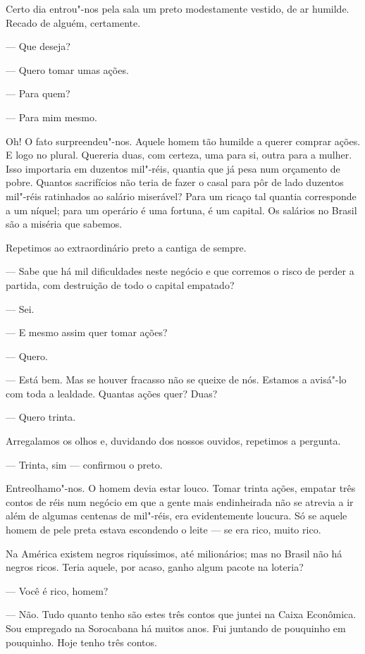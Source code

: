 Certo dia entrou"-nos pela sala um preto modestamente vestido, de ar
humilde. Recado de alguém, certamente.

--- Que deseja?

--- Quero tomar umas ações.

--- Para quem?

--- Para mim mesmo.

Oh! O fato surpreendeu"-nos. Aquele homem tão humilde a querer comprar
ações. E logo no plural. Quereria duas, com certeza, uma para si, outra
para a mulher. Isso importaria em duzentos mil"-réis, quantia que já pesa
num orçamento de pobre. Quantos sacrifícios não teria de fazer o casal
para pôr de lado duzentos mil"-réis ratinhados ao salário miserável? Para
um ricaço tal quantia corresponde a um níquel; para um operário é uma
fortuna, é um capital. Os salários no Brasil são a miséria que sabemos.

Repetimos ao extraordinário preto a cantiga de sempre.

--- Sabe que há mil dificuldades neste negócio e que corremos o risco de
perder a partida, com destruição de todo o capital empatado?

--- Sei.

--- E mesmo assim quer tomar ações?

--- Quero.

--- Está bem. Mas se houver fracasso não se queixe de nós. Estamos a
avisá"-lo com toda a lealdade. Quantas ações quer? Duas?

--- Quero trinta.

Arregalamos os olhos e, duvidando dos nossos ouvidos, repetimos a
pergunta.

--- Trinta, sim --- confirmou o preto.

Entreolhamo"-nos. O homem devia estar louco. Tomar trinta ações, empatar
três contos de réis num negócio em que a gente mais endinheirada não se
atrevia a ir além de algumas centenas de mil"-réis, era evidentemente
loucura. Só se aquele homem de pele preta estava escondendo o leite ---
se era rico, muito rico.

Na América existem negros riquíssimos, até milionários; mas no Brasil
não há negros ricos. Teria aquele, por acaso, ganho algum pacote na
loteria?

--- Você é rico, homem?

--- Não. Tudo quanto tenho são estes três contos que juntei na Caixa
Econômica. Sou empregado na Sorocabana há muitos anos. Fui juntando de
pouquinho em pouquinho. Hoje tenho três contos.


